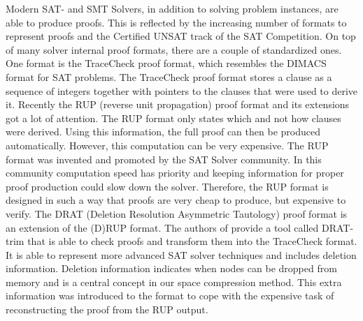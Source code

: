 Modern SAT- and SMT Solvers, in addition to solving problem instances, are able to produce proofs.
This is reflected by the increasing number of formats to represent proofs and the Certified UNSAT track of the SAT Competition.
On top of many solver internal proof formats, there are a couple of standardized ones.
One format is the TraceCheck proof format, which resembles the DIMACS format for SAT problems.
The TraceCheck proof format stores a clause as a sequence of integers together with pointers to the clauses that were used to derive it.
Recently the RUP (reverse unit propagation) proof format and its extensions got a lot of attention.
The RUP format only states which and not how clauses were derived.
Using this information, the full proof can then be produced automatically.
However, this computation can be very expensive.
The RUP format was invented and promoted by the SAT Solver community.
In this community computation speed has priority and keeping information for proper proof production could slow down the solver.
Therefore, the RUP format is designed in such a way that proofs are very cheap to produce, but expensive to verify.
The DRAT (Deletion Resolution Asymmetric Tautology) proof format \cite{Wetzler2014} is an extension of the (D)RUP format.
The authors of \cite{Wetzler2014} provide a tool called DRAT-trim that is able to check proofs and transform them into the TraceCheck format.
It is able to represent more advanced SAT solver techniques and includes deletion information.
Deletion information indicates when nodes can be dropped from memory and is a central concept in our space compression method.
This extra information was introduced to the format to cope with the expensive task of reconstructing the proof from the RUP output.


